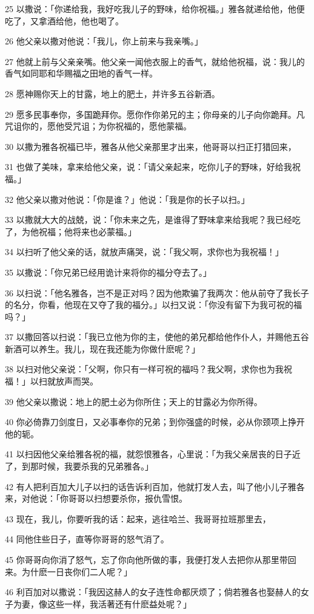 \par 25 以撒说：「你递给我，我好吃我儿子的野味，给你祝福。」雅各就递给他，他便吃了，又拿酒给他，他也喝了。
\par 26 他父亲以撒对他说：「我儿，你上前来与我亲嘴。」
\par 27 他就上前与父亲亲嘴。他父亲一闻他衣服上的香气，就给他祝福，说：我儿的香气如同耶和华赐福之田地的香气一样。
\par 28 愿神赐你天上的甘露，地上的肥土，并许多五谷新酒。
\par 29 愿多民事奉你，多国跪拜你。愿你作你弟兄的主；你母亲的儿子向你跪拜。凡咒诅你的，愿他受咒诅；为你祝福的，愿他蒙福。
\par 30 以撒为雅各祝福已毕，雅各从他父亲那里才出来，他哥哥以扫正打猎回来，
\par 31 也做了美味，拿来给他父亲，说：「请父亲起来，吃你儿子的野味，好给我祝福。」
\par 32 他父亲以撒对他说：「你是谁？」他说：「我是你的长子以扫。」
\par 33 以撒就大大的战兢，说：「你未来之先，是谁得了野味拿来给我呢？我已经吃了，为他祝福；他将来也必蒙福。」
\par 34 以扫听了他父亲的话，就放声痛哭，说：「我父啊，求你也为我祝福！」
\par 35 以撒说：「你兄弟已经用诡计来将你的福分夺去了。」
\par 36 以扫说：「他名雅各，岂不是正对吗？因为他欺骗了我两次：他从前夺了我长子的名分，你看，他现在又夺了我的福分。」以扫又说：「你没有留下为我可祝的福吗？」
\par 37 以撒回答以扫说：「我已立他为你的主，使他的弟兄都给他作仆人，并赐他五谷新酒可以养生。我儿，现在我还能为你做什麽呢？」
\par 38 以扫对他父亲说：「父啊，你只有一样可祝的福吗？我父啊，求你也为我祝福！」以扫就放声而哭。
\par 39 他父亲以撒说：地上的肥土必为你所住；天上的甘露必为你所得。
\par 40 你必倚靠刀剑度日，又必事奉你的兄弟；到你强盛的时候，必从你颈项上挣开他的轭。
\par 41 以扫因他父亲给雅各祝的福，就怨恨雅各，心里说：「为我父亲居丧的日子近了，到那时候，我要杀我的兄弟雅各。」
\par 42 有人把利百加大儿子以扫的话告诉利百加，他就打发人去，叫了他小儿子雅各来，对他说：「你哥哥以扫想要杀你，报仇雪恨。
\par 43 现在，我儿，你要听我的话：起来，逃往哈兰、我哥哥拉班那里去，
\par 44 同他住些日子，直等你哥哥的怒气消了。
\par 45 你哥哥向你消了怒气，忘了你向他所做的事，我便打发人去把你从那里带回来。为什麽一日丧你们二人呢？」
\par 46 利百加对以撒说：「我因这赫人的女子连性命都厌烦了；倘若雅各也娶赫人的女子为妻，像这些一样，我活著还有什麽益处呢？」

